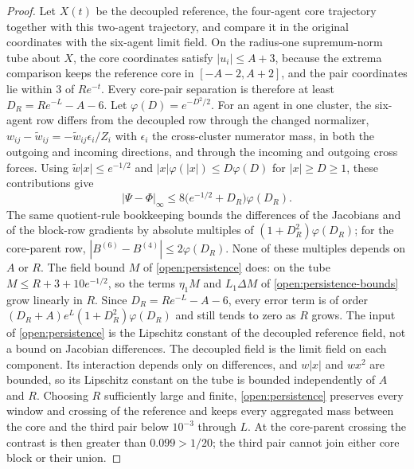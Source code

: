\begin{proof}
Let $X(t)$ be the decoupled reference, the four-agent core trajectory together with this two-agent trajectory, and compare it in the original coordinates with the six-agent limit field. On the radius-one supremum-norm tube about $X$, the core coordinates satisfy $|u_i|\le A+3$, because the extrema comparison keeps the reference core in $[-A-2,A+2]$, and the pair coordinates lie within $3$ of $Re^{-t}$. Every core-pair separation is therefore at least
$D_R=Re^{-L}-A-6$. Let $\varphi(D)=e^{-D^2/2}$. For an agent in one cluster, the six-agent row differs from the decoupled row through the changed normalizer, $w_{ij}-\widetilde w_{ij}=-\widetilde w_{ij}\epsilon_i/Z_i$ with $\epsilon_i$ the cross-cluster numerator mass, in both the outgoing and incoming directions, and through the incoming and outgoing cross forces. Using $\widetilde w|x|\le e^{-1/2}$ and $|x|\varphi(|x|)\le D\varphi(D)$ for $|x|\ge D\ge1$, these contributions give
\begin{equation}
|\Psi-\Phi|_\infty\le8\bigl(e^{-1/2}+D_R\bigr)\varphi(D_R).
\label{open:distant-bound}
\end{equation}
The same quotient-rule bookkeeping bounds the differences of the Jacobians and of the block-row gradients by absolute multiples of $(1+D_R^2)\varphi(D_R)$; for the core-parent row, $|B^{(6)}-B^{(4)}|\le2\varphi(D_R)$. None of these multiples depends on $A$ or $R$. The field bound $M$ of \cref{open:persistence} does: on the tube $M\le R+3+10e^{-1/2}$, so the terms $\eta_1M$ and $L_1\Delta M$ of \cref{open:persistence-bounds} grow linearly in $R$. Since $D_R=Re^{-L}-A-6$, every error term is of order $(D_R+A)e^L(1+D_R^2)\varphi(D_R)$ and still tends to zero as $R$ grows. The input of \cref{open:persistence} is the Lipschitz constant of the decoupled reference field, not a bound on Jacobian differences. The decoupled field is the limit field on each component. Its interaction depends only on differences, and $w|x|$ and $wx^2$ are bounded, so its Lipschitz constant on the tube is bounded independently of $A$ and $R$. Choosing $R$ sufficiently large and finite, \cref{open:persistence} preserves every window and crossing of the reference and keeps every aggregated mass between the core and the third pair below $10^{-3}$ through $L$. At the core-parent crossing the contrast is then greater than $0.099>1/20$; the third pair cannot join either core block or their union.


\end{proof}

